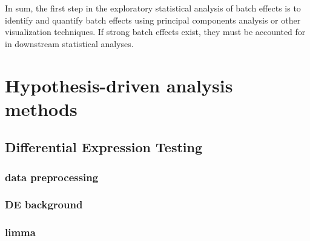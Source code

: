 In sum, the first step in the exploratory statistical analysis of batch effects is to identify and quantify batch effects using principal components analysis or other visualization techniques. If strong batch effects exist, they must be accounted for in downstream statistical analyses. 

 














\section{Hypothesis-driven analysis methods}    


    \subsection{Differential Expression Testing}
    
        \subsubsection{data preprocessing}
        \subsubsection{DE background}
        \subsubsection{limma}
